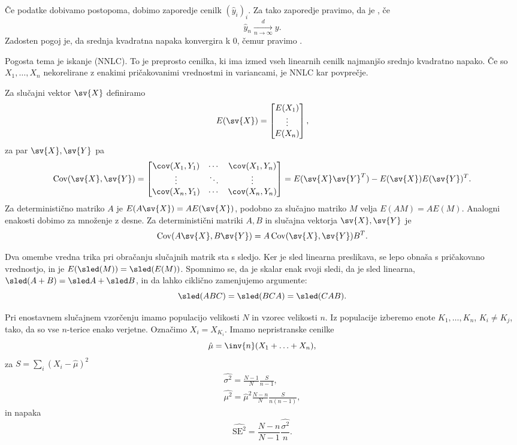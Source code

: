Če podatke dobivamo postopoma, dobimo zaporedje cenilk $(\hat{y}_i)_i$.
Za tako zaporedje pravimo, da je , če
\[
  \hat{y}_n \xrightarrow[n \to \infty]{d} y.
\]
Zadosten pogoj je, da srednja kvadratna napaka konvergira k $0$, čemur pravimo
.

Pogosta tema je iskanje  (NNLC).
To je preprosto cenilka, ki ima izmed vseh linearnih cenilk najmanjšo srednjo
kvadratno napako.
Če so $X_1, \ldots, X_n$ nekorelirane z enakimi pričakovanimi vrednostmi in
variancami, je NNLC kar povprečje.


Za slučajni vektor $\sv{X}$ definiramo 
\[
  E(\sv{X}) =
  \begin{bmatrix}
	E(X_1) \\ \vdots \\ E(X_n)
  \end{bmatrix},
\]
za par $\sv{X}, \sv{Y}$ pa 
\[
  \operatorname{Cov}(\sv{X}, \sv{Y}) =
  \begin{bmatrix}
	\cov(X_1, Y_1) & \cdots & \cov(X_1, Y_n) \\
	\vdots & \ddots & \vdots \\
	\cov(X_n, Y_1) & \cdots & \cov(X_n, Y_n)
  \end{bmatrix}
  = E(\sv{X} \sv{Y}^T) - E(\sv{X}) E(\sv{Y})^T.
\]
Za deterministično matriko $A$ je $E(A \sv{X}) = A E(\sv{X})$, podobno za
slučajno matriko $M$ velja $E(A M) = A E(M)$.
Analogni enakosti dobimo za množenje z desne.
Za deterministični matriki $A, B$ in slučajna vektorja $\sv{X}, \sv{Y}$ je
\[
  \operatorname{Cov}(A \sv{X}, B \sv{Y}) = A \operatorname{Cov}(\sv{X}, \sv{Y})
  B^T.
\]

Dva omembe vredna trika pri obračanju slučajnih matrik sta s sledjo.
Ker je sled linearna preslikava, se lepo obnaša s pričakovano vrednostjo, in je
$E(\sled(M)) = \sled(E(M))$.
Spomnimo se, da je skalar enak svoji sledi, da je sled linearna, $\sled(A+B) =
\sled A + \sled B$, in da lahko ciklično zamenjujemo argumente:
\[
  \sled(ABC) = \sled(BCA) = \sled(CAB).
\]


Pri enostavnem slučajnem vzorčenju imamo populacijo velikosti $N$ in vzorec
velikosti $n$.
Iz populacije izberemo enote $K_1, \ldots, K_n$, $K_i \ne K_j$, tako, da so vse
$n$-terice enako verjetne.
Označimo $X_i = X_{K_i}$.
Imamo nepristranske cenilke
\[
  \hat{\mu} = \inv{n} (X_1 + \ldots + X_n),
\]
za $S = \sum_i (X_i - \hat{\mu})^2$
\begin{gather*}
  \widehat{\sigma^2} = \frac{N-1}{N} \frac{S}{n-1}, \\
  \widehat{\mu^2} = \hat{\mu}^2 \frac{N-n}{N} \frac{S}{n (n-1)},
\end{gather*}
in napaka
\[
  \widehat{\text{SE}^2} = \frac{N-n}{N-1} \frac{\widehat{\sigma^2}}{n}.
\]

